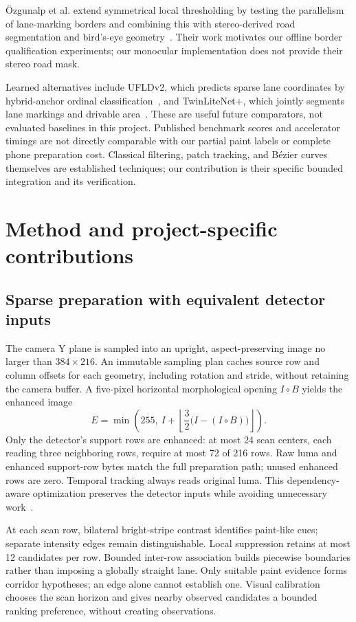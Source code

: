 \documentclass[11pt,a4paper]{article}
\begin{document}
\"Ozgunalp et al. extend symmetrical local thresholding by testing the parallelism
of lane-marking borders and combining this with stereo-derived road segmentation
and bird's-eye geometry~\cite{slt}. Their work motivates our offline border
qualification experiments; our monocular implementation does not provide their
stereo road mask.

Learned alternatives include UFLDv2, which predicts sparse lane coordinates by
hybrid-anchor ordinal classification~\cite{ufld}, and TwinLiteNet+, which jointly
segments lane markings and drivable area~\cite{twin}. These are useful future
comparators, not evaluated baselines in this project. Published benchmark scores
and accelerator timings are not directly comparable with our partial paint labels
or complete phone preparation cost. Classical filtering, patch tracking, and
B\'ezier curves themselves are established techniques; our contribution is their
specific bounded integration and its verification.

\newpage
\section{Method and project-specific contributions}
\subsection{Sparse preparation with equivalent detector inputs}
The camera Y plane is sampled into an upright, aspect-preserving image no larger
than $384\times216$. An immutable sampling plan caches source row and column
offsets for each geometry, including rotation and stride, without retaining the
camera buffer. A five-pixel horizontal morphological opening $I\circ B$ yields
the enhanced image
\begin{equation}
  E=\min\!\left(255,\ I+\left\lfloor\frac{3}{2}
       \bigl(I-(I\circ B)\bigr)\right\rfloor\right).
\end{equation}
Only the detector's support rows are enhanced: at most 24 scan centers, each
reading three neighboring rows, require at most 72 of 216 rows. Raw luma and
enhanced support-row bytes match the full preparation path; unused enhanced rows
are zero. Temporal tracking always reads original luma. This dependency-aware
optimization preserves the detector inputs while avoiding unnecessary work~\cite{prep}.

At each scan row, bilateral bright-stripe contrast identifies paint-like cues;
separate intensity edges remain distinguishable. Local suppression retains at
most 12 candidates per row. Bounded inter-row association builds piecewise
boundaries rather than imposing a globally straight lane. Only suitable paint
evidence forms corridor hypotheses; an edge alone cannot establish one.
Visual calibration chooses the scan horizon and gives nearby observed candidates
a bounded ranking preference, without creating observations.
\end{document}
